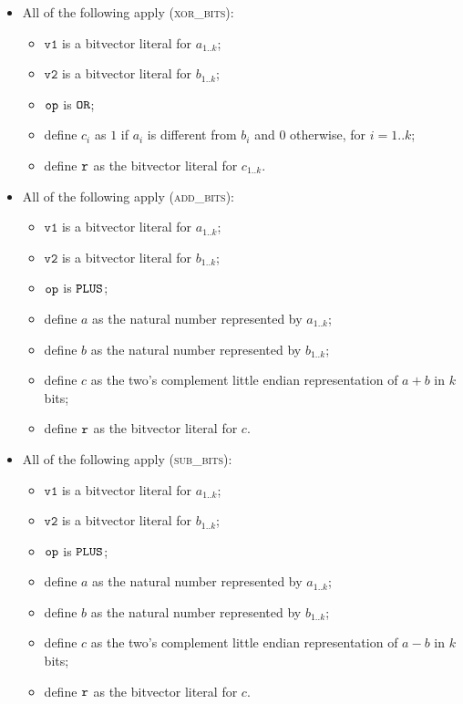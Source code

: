 \documentclass{book}
\newcommand\vvone[0]{\texttt{v1}}
\newcommand\vvtwo[0]{\texttt{v2}}
\begin{document}
\begin{itemize}
  \item All of the following apply (\textsc{xor\_bits}):
  \begin{itemize}
    \item $\vvone$ is a bitvector literal for $a_{1..k}$;
    \item $\vvtwo$ is a bitvector literal for $b_{1..k}$;
    \item $\texttt{op}$ is $\texttt{OR}$;
    \item define $c_i$ as $1$ if $a_i$ is different from $b_i$ and $0$ otherwise, for $i=1..k$;
    \item define $\texttt{r}$ as the bitvector literal for $c_{1..k}$.
  \end{itemize}

  \item All of the following apply (\textsc{add\_bits}):
  \begin{itemize}
    \item $\vvone$ is a bitvector literal for $a_{1..k}$;
    \item $\vvtwo$ is a bitvector literal for $b_{1..k}$;
    \item $\texttt{op}$ is $\texttt{PLUS}$;
    \item define $a$ as the natural number represented by $a_{1..k}$;
    \item define $b$ as the natural number represented by $b_{1..k}$;
    \item define $c$ as the two's complement little endian representation of $a+b$ in $k$ bits;
    \item define $\texttt{r}$ as the bitvector literal for $c$.
  \end{itemize}

  \item All of the following apply (\textsc{sub\_bits}):
  \begin{itemize}
    \item $\vvone$ is a bitvector literal for $a_{1..k}$;
    \item $\vvtwo$ is a bitvector literal for $b_{1..k}$;
    \item $\texttt{op}$ is $\texttt{PLUS}$;
    \item define $a$ as the natural number represented by $a_{1..k}$;
    \item define $b$ as the natural number represented by $b_{1..k}$;
    \item define $c$ as the two's complement little endian representation of $a-b$ in $k$ bits;
    \item define $\texttt{r}$ as the bitvector literal for $c$.
  \end{itemize}


\end{itemize}
\end{document}
